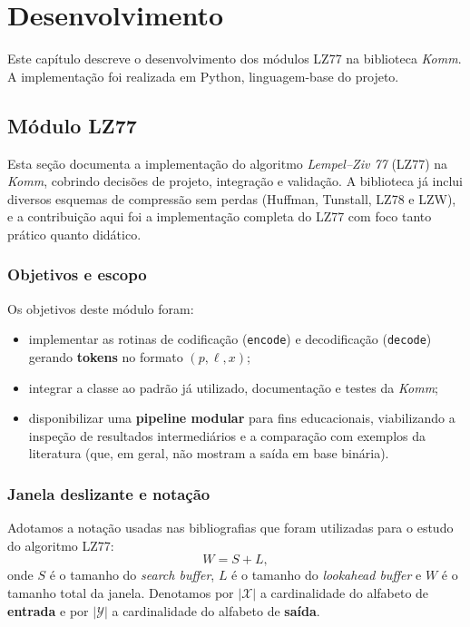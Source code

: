 \chapter{Desenvolvimento}\label{cap:desenvolvimento}

Este capítulo descreve o desenvolvimento dos módulos LZ77 na biblioteca \textit{Komm}. A implementação foi realizada em
Python, linguagem-base do projeto.

\section{Módulo LZ77}

Esta seção documenta a implementação do algoritmo \textit{Lempel–Ziv 77} (LZ77)
na \textit{Komm}, cobrindo decisões de projeto, integração e validação. A
biblioteca já inclui diversos esquemas de compressão sem perdas (Huffman,
Tunstall, LZ78 e LZW), e a contribuição aqui foi a implementação completa do
LZ77 com foco tanto prático quanto didático.

\subsection{Objetivos e escopo}

Os objetivos deste módulo foram:
\begin{itemize}
    \item implementar as rotinas de codificação (\texttt{encode}) e decodificação
          (\texttt{decode}) gerando \textbf{tokens} no formato \((p,\ell,x)\);
    \item integrar a classe ao padrão já utilizado, documentação e testes da \textit{Komm};
    \item disponibilizar uma \textbf{pipeline modular} para fins educacionais,
          viabilizando a inspeção de resultados intermediários e a comparação com
          exemplos da literatura (que, em geral, não mostram a saída em base binária).
\end{itemize}

\subsection{Janela deslizante e notação}\label{subsec:janela-notacao}

Adotamos a notação usadas nas bibliografias que foram utilizadas para o estudo do algoritmo LZ77:
\[
    W = S + L,
\]
onde \(S\) é o tamanho do \emph{search buffer}, \(L\) é o tamanho do
\emph{lookahead buffer} e \(W\) é o tamanho total da janela. Denotamos por \(
|\mathcal{X}| \) a cardinalidade do alfabeto de \textbf{entrada} e por \(
|\mathcal{Y}| \) a cardinalidade do alfabeto de \textbf{saída}.

